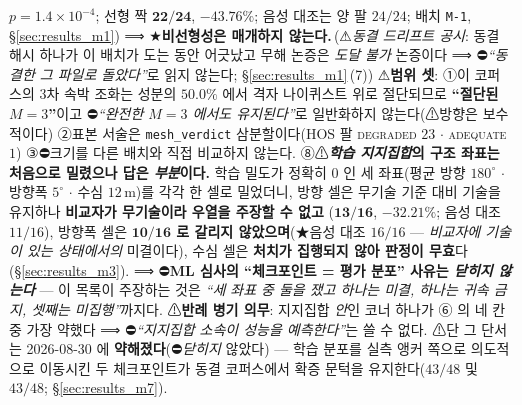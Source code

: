 \documentclass[11pt]{report}
\numberwithin{equation}{chapter}
\numberwithin{figure}{chapter}
\numberwithin{table}{chapter}
\newcommand{\MOneDrift}{\,(⚠\emph{동결 드리프트 공시}: 동결 해시 하나가 이 배치가 도는
동안 어긋났고 무해 논증은 \emph{도달 불가} 논증이다 ⟹ ⛔\emph{``동결한 그 파일로
돌았다''}로 읽지 않는다; \S\ref{sec:results_m1}\,(7))}
\begin{document}
\begin{enumerate}
        $p = 1.4\times10^{-4}$; 선형 짝 $\mathbf{22/24}$, $-43.76\%$; 음성 대조는 양 팔
        $24/24$; 배치 \texttt{M-1}, \S\ref{sec:results_m1}) ⟹ ★\textbf{비선형성은 매개하지
        않는다.}\MOneDrift{} ⚠\textbf{범위 셋}: ①이 코퍼스의 $3$차 속박 조화는 성분의 $50.0\%$ 에서
        격자 나이퀴스트 위로 절단되므로 \textbf{``절단된 $M{=}3$''}이고 ⛔\emph{``완전한
        $M{=}3$ 에서도 유지된다''}로 일반화하지 않는다(⚠방향은 보수적이다) ②표본 서술은
        \texttt{mesh\_verdict} 삼분할이다($\text{HOS}$ 팔 \textsc{degraded} $23$
        $\cdot$ \textsc{adequate} $1$) ③⛔크기를 다른 배치와 직접 비교하지 않는다.
        ⑧⚠\textbf{\emph{학습 지지집합}의 구조 좌표는 처음으로 밀렸으나 답은 \emph{부분}이다.}
        학습 밀도가 정확히 $0$ 인 세 좌표(평균 방향 $180^\circ$ $\cdot$ 방향폭 $5^\circ$
        $\cdot$ 수심 $12$\,m)를 각각 한 셀로 밀었더니, 방향 셀은 무기술 기준 대비
        기술을 유지하나 \textbf{비교자가 무기술이라 우열을 주장할 수 없고}
        ($\mathbf{13/16}$, $-32.21\%$; 음성 대조 $11/16$), 방향폭 셀은
        \textbf{$\mathbf{10/16}$ 로 갈리지 않았으며}(★음성 대조 $16/16$ ---
        \emph{비교자에 기술이 있는 상태에서의} 미결이다), 수심 셀은 \textbf{처치가 집행되지
        않아 판정이 무효}다(\S\ref{sec:results_m3}). ⟹ ⛔\textbf{ML 심사의 ``체크포인트 =
        평가 분포'' 사유는 \emph{닫히지 않는다}} --- 이 목록이 주장하는 것은
        \emph{``세 좌표 중 둘을 쟀고 하나는 미결, 하나는 귀속 금지, 셋째는 미집행''}까지다.
        ⚠\textbf{반례 병기 의무}: 지지집합 \emph{안}인 코너 하나가 ⑥ 의 네 칸 중 가장 약했다
        ⟹ ⛔\emph{``지지집합 소속이 성능을 예측한다''}는 쓸 수 없다.
        ⚠단 그 단서는 2026-08-30 에 \textbf{약해졌다}(⛔\emph{닫히지} 않았다) --- 학습 분포를
        실측 앵커 쪽으로 의도적으로 이동시킨 두 체크포인트가 동결 코퍼스에서 확증 문턱을
        유지한다($43/48$ 및 $43/48$; \S\ref{sec:results_m7}).

\end{enumerate}
\end{document}
